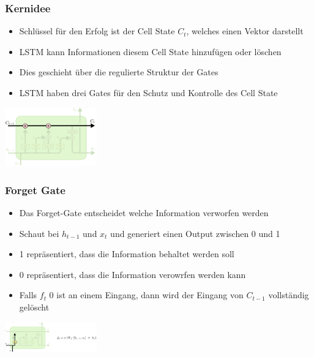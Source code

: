 \documentclass{article}
\newenvironment{Figure}
	{\par\medskip\noindent\minipage{\linewidth}}
	{\endminipage\par\medskip}
\theoremstyle{merke}
\theoremstyle{definition}
\begin{document}
            \subsubsection{Kernidee}
            \begin{itemize}
                \item Schlüssel für den Erfolg ist der Cell State \textbf{$C_t$}, welches einen Vektor darstellt
                \item LSTM kann Informationen diesem Cell State hinzufügen oder löschen
                \item Dies geschieht über die regulierte Struktur der Gates
                \item LSTM haben drei Gates für den Schutz und Kontrolle des Cell State
            \end{itemize}
            \begin{Figure}
            \centering
            \includegraphics[width=150px]{img/LSTMCellState.png}
                \label{fig:Abbildung des Cell State in LSTM}
            \end{Figure}
        
            \subsubsection{Forget Gate}
            \begin{itemize}
                \item Das Forget-Gate entscheidet welche Information verworfen werden
                \item Schaut bei $h_{t-1}$ und $x_t$ und generiert einen Output zwischen 0 und 1
                \item 1 repräsentiert, dass die Information behaltet werden soll
                \item 0 repräsentiert, dass die Information verowrfen werden kann
                \item Falls $f_t$ 0 ist an einem Eingang, dann wird der Eingang von $C_{t-1}$ vollständig gelöscht
            \end{itemize}
            \begin{Figure}
            \centering
            \includegraphics[width=150px]{img/LSTMForgetGate.png}
                \label{fig:Abbildung des Forget Gates in LSTM}
            \end{Figure}
        
\end{document}
